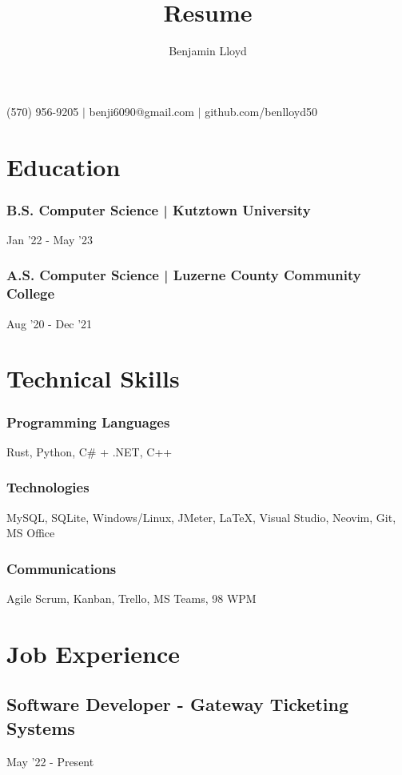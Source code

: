 \documentclass{article}
\makeatletter
\renewcommand{\maketitle}{
\begin{center}
{\huge\bfseries\theauthor}

\vspace{.25em}

{}(570) 956-9205 $\vert$ {}benji6090@gmail.com $\vert$ {}github.com/benlloyd50

\end{center}
}
\makeatother
\begin{document}
\title{Resume}

\author{Benjamin Lloyd}

\maketitle

\section{Education}
\subsubsection{B.S. Computer Science | Kutztown University} \hfill Jan '22 - May '23

\subsubsection{A.S. Computer Science | Luzerne County Community College} \hfill Aug '20 - Dec '21


\section{Technical Skills}

\subsubsection{Programming Languages} Rust, Python, C\# + .NET, C++

\subsubsection{Technologies} MySQL, SQLite, Windows/Linux, JMeter, {\LaTeX}, Visual Studio, Neovim, Git, MS Office

\subsubsection{Communications} Agile Scrum, Kanban, Trello, MS Teams,  98 WPM

\section{Job Experience}
\subsection{Software Developer - Gateway Ticketing Systems} \hfill May '22 - Present
\end{document}
